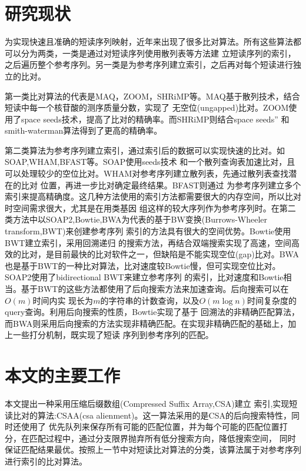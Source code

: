 \section{研究现状}
为实现快速且准确的短读序列映射，近年来出现了很多比对算法。所有这些算法都可以分为两类，一类是通过对短读序列使用散列表等方法建
立短读序列的索引，之后遍历整个参考序列。另一类是为参考序列建立索引，之后再对每个短读进行独立的比对。

第一类比对算法的代表是MAQ，ZOOM，SHRiMP等。MAQ\cite{li2008mapping}基于散列技术，结合短读中每一个核苷酸的测序质量分数，实现了
无空位(ungapped)比对。ZOOM\cite{lin2008zoom}使用了space seeds技术，提高了比对的精确率。而SHRiMP\cite{rumble2009shrimp}则结合space seeds''
和smith-waterman算法得到了更高的精确率。

第二类算法为参考序列建立索引，通过索引后的数据可以实现快速的比对。如SOAP,WHAM,BFAST等。SOAP\cite{li2008soap}使用seeds技术
和一个散列查询表加速比对，且可以处理较少的空位比对。WHAM\cite{li2012wham}对参考序列建立散列表，先通过散列表查找潜在的比对
位置，再进一步比对确定最终结果。BFAST\cite{homer2009bfast}则通过
为参考序列建立多个索引来提高精确度。这几种方法使用的索引方法都需要很大的内存空间，所以比对时空间需求很大，尤其是在用类基因
组这样的较大序列作为参考序列时。在第二类方法中以SOAP2,Bowtie,BWA为代表的基于BW变换(Burrows-Wheeler transform,BWT)\cite{ferragina2005indexing}来创建参考序列
索引的方法具有很大的空间优势。Bowtie\cite{langmead2009ultrafast}使用BWT建立索引，采用回溯递归
的搜索方法，再结合双端搜索实现了高速，空间高效的比对，是目前最快的比对软件之一，但缺陷是不能实现空位(gap)比对。BWA\cite{li2009fast}
也是基于BWT的一种比对算法，比对速度较Bowtie慢，但可实现空位比对。SOAP2\cite{li2009soap2}使用了bidirectional BWT来建立参考序列
的索引，比对速度和Bowtie相当。基于BWT的这些方法都使用了后向搜索方法\cite{lippert2005space}来加速查询。后向搜索可以在$O(m)$时间内实
现长为$m$的字符串的计数查询，以及$O(m\log n)$时间复杂度的query查询。利用后向搜索的性质，Bowtie实现了基于
回溯法的非精确匹配算法，而BWA则采用后向搜索的方法实现非精确匹配。在实现非精确匹配的基础上，加上一些打分机制，既实现了短读
序列到参考序列的匹配。

\section{本文的主要工作}

本文提出一种采用压缩后缀数组(Compressed Suffix Array,CSA)建立
索引\cite{grossi2005compressed},实现短读比对的算法:CSAA(csa alienment)。这一算法采用的是CSA的后向搜索特性，同时还使用了
优先队列来保存所有可能的匹配位置，并为每个可能的匹配位置打分，在匹配过程中，通过分支限界抛弃所有低分搜索方向，降低搜索空间，
同时保证匹配结果最优。按照上一节中对短读比对算法的分类，该算法属于对参考序列进行索引的比对算法。

